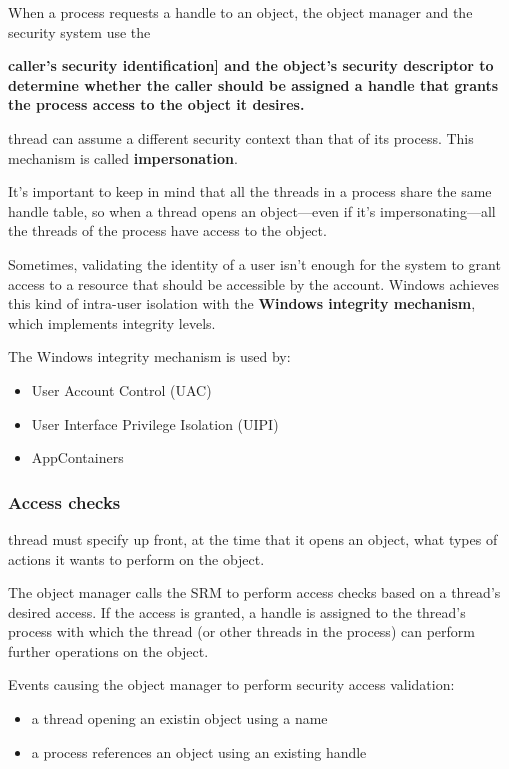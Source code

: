 When a process requests a handle to an object, the object manager and the security system use the  {\bf  caller’s security identification] and the {\bf object’s security descriptor} to determine whether the caller should be assigned a handle that grants the process access to the object it desires.

thread can assume a different security context than that of its process. This mechanism is called {\bf impersonation}.

It’s important to keep in mind that all the threads in a process share the same handle table, so when a
thread opens an object—even if it’s impersonating—all the threads of the process have access to the
object.

Sometimes, validating the identity of a user isn’t enough for the system to grant access to a resource that
should be accessible by the account. Windows achieves this kind of intra-user isolation with the {\bf Windows integrity mechanism}, which  implements integrity levels.

The Windows integrity mechanism is used by:
\begin{itemize}
    \item User Account Control (UAC)
    \item User Interface Privilege Isolation (UIPI)
    \item AppContainers
\end{itemize}




\subsubsection{Access checks}

thread must specify  up front, at the time that it opens an object, what types of actions it wants to perform on the object.

The object manager calls the SRM to perform access checks based on a thread’s desired access. If the access is granted, a handle is assigned to the thread’s process with which the thread (or other threads in the process) can perform further operations on the object.

Events causing the object manager to perform security access validation:
\begin{itemize}
    \item a thread opening an existin object using a name
    \item a process references an object using an existing handle
\end{itemize}

}
